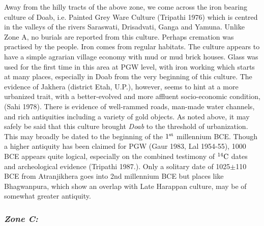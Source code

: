Away from the hilly tracts of the above zone, we come across the iron bearing culture of Doab, i.e. Painted Grey Ware Culture (Tripathi 1976) which is centred in the valleys of the rivers Saraswati, Drisadvati, Ganga and Yamuna. Unlike Zone A, no burials are reported from this culture. Perhaps cremation was practised by the people. Iron comes from regular habitats. The culture appears to have a simple agrarian village economy with mud or mud brick houses. Glass was used for the first time in this area at PGW level, with iron working which starts at many places, especially in Doab from the very beginning of this culture. The evidence of Jakhera (district Etah, U.P.), however, seems to hint at a more urbanized trait, with a better-evolved and more affluent socio-economic condition, (Sahi 1978). There is evidence of well-rammed roads, man-made water channels, and rich antiquities including a variety of gold objects. As noted above, it may safely be said that this culture brought \textit{Doab} to the threshold of urbanization. This may broadly be dated to the beginning of the $1^{\rm st}$ millennium BCE. Though a higher antiquity has been claimed for PGW (Gaur 1983, Lal 1954-55), 1000 BCE appears quite logical, especially on the combined testimony of $^{14}{\rm C}$ dates and archeological evidence (Tripathi 1987.). Only a solitary date of 1025$\pm$110 BCE from Atranjikhera goes into 2nd millennium BCE but places like Bhagwanpura, which show an overlap with Late Harappan culture, may be of somewhat greater antiquity.

\subsubsection*{\textit{Zone C:}}

